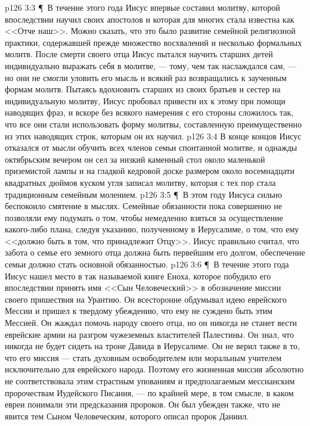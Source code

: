 \vs p126 3:3 \P\ В течение этого года Иисус впервые составил молитву, которой впоследствии научил своих апостолов и которая для многих стала известна как <<Отче наш>>. Можно сказать, что это было развитие семейной религиозной практики, содержавшей прежде множество восхвалений и несколько формальных молитв. После смерти своего отца Иисус пытался научить старших детей индивидуально выражать себя в молитве, --- тому, чем так наслаждался сам, --- но они не смогли уловить его мысль и всякий раз возвращались к заученным формам молитв. Пытаясь вдохновить старших из своих братьев и сестер на индивидуальную молитву, Иисус пробовал привести их к этому при помощи наводящих фраз, и вскоре без всякого намерения с его стороны сложилось так, что все они стали использовать форму молитвы, составленную преимущественно из этих наводящих строк, которым он их научил.
\vs p126 3:4 В конце концов Иисус отказался от мысли обучить всех членов семьи спонтанной молитве, и однажды октябрьским вечером он сел за низкий каменный стол около маленькой приземистой лампы и на гладкой кедровой доске размером около восемнадцати квадратных дюймов куском угля записал молитву, которая с тех пор стала традиционным семейным молением.
\vs p126 3:5 \P\ В этом году Иисуса сильно беспокоило смятение в мыслях. Семейные обязанности пока совершенно не позволяли ему подумать о том, чтобы немедленно взяться за осуществление какого\hyp{}либо плана, следуя указанию, полученному в Иерусалиме, о том, что ему <<должно быть в том, что принадлежит Отцу>>. Иисус правильно считал, что забота о семье его земного отца должна быть первейшим его долгом, обеспечение семьи должно стать основной обязанностью.
\vs p126 3:6 \P\ В течение этого года Иисус нашел место в так называемой книге Еноха, которое побудило его впоследствии принять имя <<Сын Человеческий>> в обозначение миссии своего пришествия на Урантию. Он всесторонне обдумывал идею еврейского Мессии и пришел к твердому убеждению, что ему не суждено быть этим Мессией. Он жаждал помочь народу своего отца, но он никогда не станет вести еврейские армии на разгром чужеземных властителей Палестины. Он знал, что никогда не будет сидеть на троне Давида в Иерусалиме. Он не верил также в то, что его миссия --- стать духовным освободителем или моральным учителем исключительно для еврейского народа. Поэтому его жизненная миссия абсолютно не соответствовала этим страстным упованиям и предполагаемым мессианским пророчествам Иудейского Писания, --- по крайней мере, в том смысле, в каком евреи понимали эти предсказания пророков. Он был убежден также, что не явится тем Сыном Человеческим, которого описал пророк Даниил.
